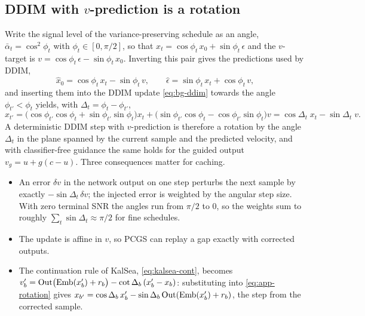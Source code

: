 \subsection{DDIM with \texorpdfstring{$v$}{v}-prediction is a rotation}\label{sec:app-ddim-rotation}
Write the signal level of the variance-preserving schedule as an angle, $\bar\alpha_t = \cos^2\phi_t$ with $\phi_t\in[0,\pi/2]$, so that $x_t = \cos\phi_t\,x_0 + \sin\phi_t\,\epsilon$ and the $v$-target is $v = \cos\phi_t\,\epsilon - \sin\phi_t\,x_0$. Inverting this pair gives the predictions used by DDIM,
\begin{equation}
  \hat x_0 = \cos\phi_t\,x_t - \sin\phi_t\,v, \qquad \hat\epsilon = \sin\phi_t\,x_t + \cos\phi_t\,v ,
\end{equation}
and inserting them into the DDIM update \cref{eq:bg-ddim} towards the angle $\phi_{t'}<\phi_t$ yields, with $\Delta_t = \phi_t-\phi_{t'}$,
\begin{equation}\label{eq:app-rotation}
  x_{t'} = \big(\cos\phi_{t'}\cos\phi_t + \sin\phi_{t'}\sin\phi_t\big)x_t + \big(\sin\phi_{t'}\cos\phi_t - \cos\phi_{t'}\sin\phi_t\big)v
         = \cos\Delta_t\; x_t - \sin\Delta_t\; v .
\end{equation}
A deterministic DDIM step with $v$-prediction is therefore a rotation by the angle $\Delta_t$ in the plane spanned by the current sample and the predicted velocity, and with classifier-free guidance the same holds for the guided output $v_g = u+g(c-u)$. Three consequences matter for caching.
\begin{itemize}
  \item An error $\delta v$ in the network output on one step perturbs the next sample by exactly $-\sin\Delta_t\,\delta v$; the injected error is weighted by the angular step size. With zero terminal SNR the angles run from $\pi/2$ to $0$, so the weights sum to roughly $\sum_t \sin\Delta_t \approx \pi/2$ for fine schedules.
  \item The update is affine in $v$, so PCGS can replay a gap exactly with corrected outputs.
  \item The continuation rule of KalSea, \cref{eq:kalsea-cont}, becomes $v'_b = \mathrm{Out}\big(\mathrm{Emb}(x'_b)+r_b\big) - \cot\Delta_b\,(x'_b - x_b)$: substituting into \cref{eq:app-rotation} gives $x_{b'} = \cos\Delta_b\,x'_b - \sin\Delta_b\,\mathrm{Out}(\mathrm{Emb}(x'_b)+r_b)$, the step from the corrected sample.
\end{itemize}

